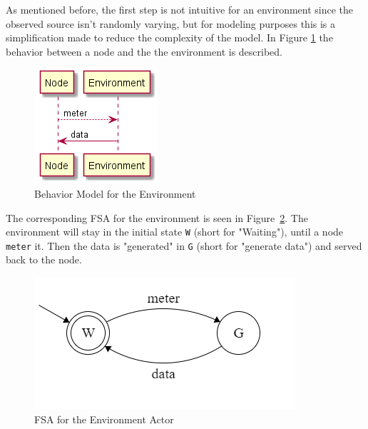 As mentioned before, the first step is not intuitive for an environment since the observed source isn't randomly varying, but for modeling purposes this is a simplification made to reduce the complexity of the model. In Figure \ref{fig:behav_example} the behavior between a node and the the environment is described.


\begin{figure}[ht]
    \includegraphics[]{include/figures/env_behav}
    \caption{Behavior Model for the Environment}
    \label{fig:behav_example}
\end{figure}

The corresponding FSA for the environment is seen in Figure~\ref{fig:env_states}. The environment will stay in the initial state \texttt{W} (short for "Waiting"), until a node \texttt{meter} it. Then the data is "generated" in \texttt{G} (short for "generate data") and served back to the node.  


\begin{figure}
    \includegraphics{include/figures/environment_actor}
    \caption{FSA for the Environment Actor}
    \label{fig:env_states}
\end{figure}

